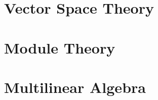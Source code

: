 \documentclass[12pt, a4paper, oneside, openright, titlepage]{book}
\begin{document}
\tableofcontents

\part{Vector Space Theory}



























\part{Module Theory}
















\part{Multilinear Algebra}






\end{document}
